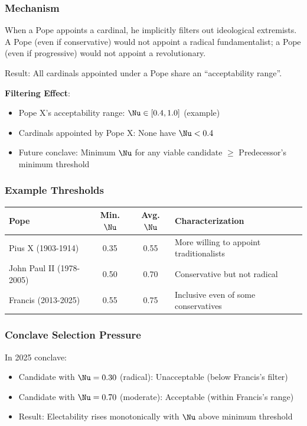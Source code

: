 \documentclass[11pt]{article}
\begin{document}
\subsubsection{Mechanism}

When a Pope appoints a cardinal, he implicitly filters out ideological extremists. A Pope (even if conservative) would not appoint a radical fundamentalist; a Pope (even if progressive) would not appoint a revolutionary.

Result: All cardinals appointed under a Pope share an ``acceptability range''.

\textbf{Filtering Effect}:
\begin{itemize}
\item Pope X's acceptability range: $\Nu \in [0.4, 1.0]$ (example)
\item Cardinals appointed by Pope X: None have $\Nu < 0.4$
\item Future conclave: Minimum $\Nu$ for any viable candidate $\geq$ Predecessor's minimum threshold
\end{itemize}

\subsubsection{Example Thresholds}

\begin{table}[h]
\centering
\begin{tabular}{|l|c|c|l|}
\hline
\textbf{Pope} & \textbf{Min. } $\Nu$ & \textbf{Avg. } $\Nu$ & \textbf{Characterization} \\
\hline
Pius X (1903-1914) & 0.35 & 0.55 & More willing to appoint traditionalists \\
John Paul II (1978-2005) & 0.50 & 0.70 & Conservative but not radical \\
Francis (2013-2025) & 0.55 & 0.75 & Inclusive even of some conservatives \\
\hline
\end{tabular}
\end{table}

\subsubsection{Conclave Selection Pressure}

In 2025 conclave:
\begin{itemize}
\item Candidate with $\Nu = 0.30$ (radical): Unacceptable (below Francis's filter)
\item Candidate with $\Nu = 0.70$ (moderate): Acceptable (within Francis's range)
\item Result: Electability rises monotonically with $\Nu$ above minimum threshold
\end{itemize}
\end{document}
